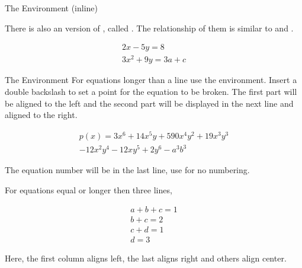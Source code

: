 \begin{frame}[fragile]{The  Environment (inline) }

There is also an  version of , called . The relationship of them is similar to  and .

\begin{latexexamplesplit}
\begin{equation} 
  \begin{gathered} 
    2x - 5y =  8 \\ 
    3x^2 + 9y =  3a + c
  \end{gathered}
\end{equation}
\end{latexexamplesplit}

\end{frame}


\begin{frame}[fragile]{The  Environment}
For equations longer than a line use the  environment. Insert a double backslash to set a point for the equation to be broken. The first part will be aligned to the left and the second part will be displayed in the next line and aligned to the right.

\begin{latexexample}
\begin{multline}
  p(x) = 3x^6 + 14x^5y + 590x^4y^2 + 19x^3y^3 \\ 
         - 12x^2y^4 - 12xy^5 + 2y^6 - a^3b^3
\end{multline}
\end{latexexample}

The equation number will be in the last line, use  for no numbering.

\end{frame}

\begin{frame}[fragile]

For equations equal or longer then three lines,

\begin{latexexample}
\begin{multline*}
  a+b+c=1 \\ 
  b+c=2 \\
  c+d=1 \\
  d=3
\end{multline*}
\end{latexexample}

Here, the first column aligns left, the last aligns right and others align center. 

\end{frame}

